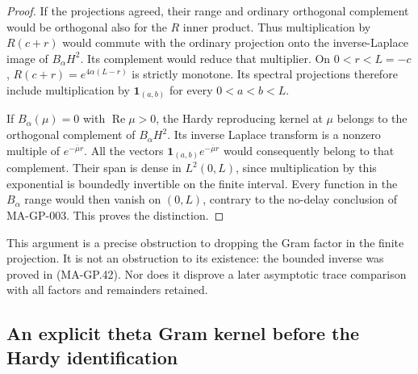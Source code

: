 \begin{proof}
If the projections agreed, their range and ordinary orthogonal
complement would be orthogonal also for the $R$ inner product.
Thus multiplication by $R(c+r)$ would commute with the
ordinary projection onto the inverse-Laplace image of
$B_\alpha H^2$.  Its complement would reduce that multiplier.
On $0<r<L=-c$, $R(c+r)=e^{4\alpha(L-r)}$ is strictly
monotone.  Its spectral projections therefore include
multiplication by $\mathbf1_{(a,b)}$ for every
$0<a<b<L$.

If $B_\alpha(\mu)=0$ with $\operatorname{Re}\mu>0$,
the Hardy reproducing kernel at $\mu$ belongs to the
orthogonal complement of $B_\alpha H^2$.  Its inverse
Laplace transform is a nonzero multiple of
$e^{-\overline\mu r}$.
All the vectors $\mathbf1_{(a,b)}e^{-\overline\mu r}$
would consequently belong to that complement.  Their span
is dense in $L^2(0,L)$, since multiplication by this
exponential is boundedly invertible on the finite interval.
Every function in the $B_\alpha$ range would then vanish
on $(0,L)$, contrary to the no-delay conclusion of
MA-GP-003.  This proves the distinction.
\end{proof}

This argument is a precise obstruction to dropping the Gram
factor in the finite projection.  It is not an obstruction to
its existence: the bounded inverse was proved in (MA-GP.42).
Nor does it disprove a later asymptotic trace comparison with
all factors and remainders retained.

\subsection{An explicit theta Gram kernel before the Hardy identification}

